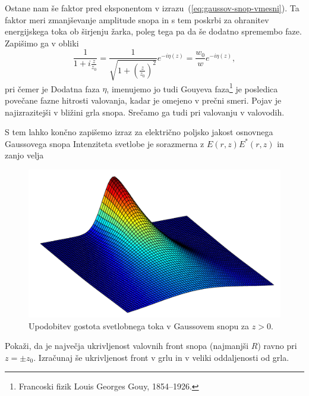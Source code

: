 Ostane nam še faktor pred eksponentom v izrazu~(\ref{eq:gaussov-snop-vmesni}). Ta faktor meri
zmanjševanje amplitude snopa in s tem poskrbi za ohranitev energijskega
toka ob širjenju žarka, poleg tega pa da še dodatno spremembo faze. Zapišimo ga v obliki
\begin{equation}
\frac{1}{1+i\frac{z}{z_{0}}}=\frac{1}{\sqrt{1+(\frac{z}{z_0})^{2}}}e^{-i\eta(z)}=\frac{w_{0}}{w}e^{-i\eta(z)},
\end{equation}
 pri čemer je
Dodatna faza $\eta$, imenujemo jo tudi Gouyeva 
faza\footnote{Francoski fizik Louis Georges Gouy, 1854--1926.}
je posledica povečane fazne hitrosti valovanja,
kadar je omejeno v prečni smeri. Pojav je najizrazitejši v bližini
grla snopa. Srečamo ga tudi pri valovanju v valovodih.

S tem lahko končno zapišemo izraz za električno poljsko jakost osnovnega Gaussovega snopa
Intenziteta svetlobe je sorazmerna z $E(r,z)E^*(r,z)$ in zanjo velja


\begin{figure}[h]
\centering
\includegraphics[width=8truecm]{slike/03_Gauss_3D.png}
\caption{Upodobitev gostota svetlobnega toka v Gaussovem snopu za $z>0$. }
\label{fig:Gauss_3D}
\end{figure}

\begin{definition}
\label{naloga-ukrivljenost-snopa}
Pokaži, da je največja ukrivljenost valovnih front snopa (najmanjši $R$) ravno pri $z=\pm z_{0}$.
Izračunaj še ukrivljenost front v grlu in v veliki oddaljenosti od grla.
\end{definition}

